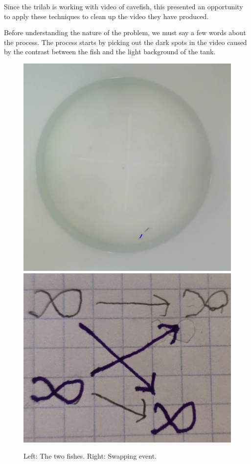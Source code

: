 \documentclass{article}
\begin{document}
Since the trilab is working with video of cavefish, this presented an opportunity to apply these techniques to clean up the video they have produced.

Before understanding the nature of the problem, we must say a few words about the process. The process starts by picking out the dark spots in the video caused by the contrast between the fish and the light background of the tank.


\begin{figure}[H]
	\centering
	\newlength{\myL}
	\setlength{\myL}{0.4\linewidth}
	\includegraphics[height=\myL]{fish}
	\hspace{0.05\linewidth}
	\includegraphics[height=\myL]{img1}
	\caption{Left: The two fishes. Right: Swapping event.}
	\label{fig:fish1}
\end{figure}
\end{document}
